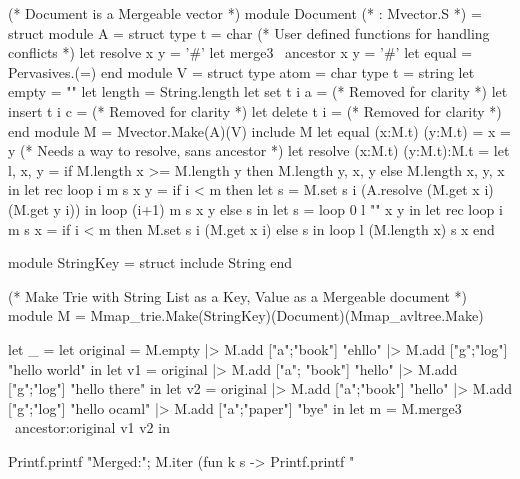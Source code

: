 \documentclass{article}
\begin{document}
\begin{longlisting}
(* Document is a Mergeable vector *)
module Document (* : Mvector.S *) = struct
  module A = struct
    type t = char
    (* User defined functions for handling conflicts *)
    let resolve x y = '#'
    let merge3 ~ancestor x y = '#'
    let equal = Pervasives.(=)
  end
  module V = struct
    type atom = char
    type t = string
    let empty = ""
    let length = String.length
    let set t i a =
      (* Removed for clarity *)
    let insert t i c =
      (* Removed for clarity *)
    let delete t i =
      (* Removed for clarity *)
  end
  module M = Mvector.Make(A)(V)
  include M
  let equal (x:M.t) (y:M.t) = x = y
  (* Needs a way to resolve, sans ancestor *)
  let resolve (x:M.t) (y:M.t):M.t =
    let l, x, y = 
      if M.length x >= M.length y then M.length y, x, y 
      else M.length x, y, x in
    let rec loop i m s x y =
      if i < m then
        let s = M.set s i (A.resolve (M.get x i) (M.get y i)) in
        loop (i+1) m s x y
      else s in
    let s = loop 0 l "" x y in
    let rec loop i m s x =
      if i < m then M.set s i (M.get x i)
      else s in 
    loop l (M.length x) s x
end

module StringKey = struct
  include String
end

(* Make Trie with String List as a Key, Value as a Mergeable document *)
module M = Mmap_trie.Make(StringKey)(Document)(Mmap_avltree.Make)

let _ =
  let original = M.empty |> M.add ["a";"book"] "ehllo" |> M.add ["g";"log"] "hello world" in
  let v1 = original |> M.add ["a"; "book"] "hello" |> M.add ["g";"log"] "hello there" in
  let v2 = original |> M.add ["a";"book"] "hello" |> 
            M.add ["g";"log"] "hello ocaml" |> M.add ["a";"paper"] "bye" in
  let m = M.merge3 ~ancestor:original v1 v2 in

  Printf.printf "Merged:\n";
  M.iter (fun k s -> Printf.printf "%
\end{longlisting}

\newpage
\end{document}
